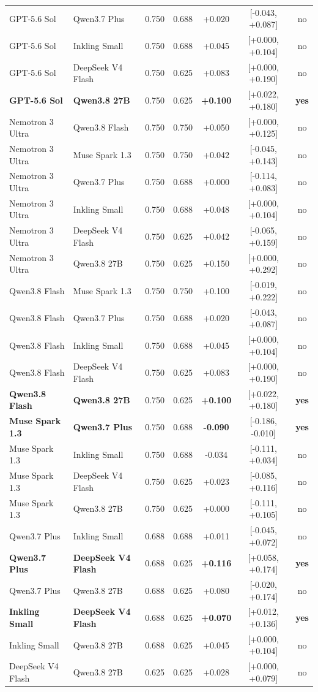 \begin{longtable}{llrrccc}
GPT-5.6 Sol & Qwen3.7 Plus & 0.750 & 0.688 & +0.020 & [-0.043, +0.087] & no \\
GPT-5.6 Sol & Inkling Small & 0.750 & 0.688 & +0.045 & [+0.000, +0.104] & no \\
GPT-5.6 Sol & DeepSeek V4 Flash & 0.750 & 0.625 & +0.083 & [+0.000, +0.190] & no \\
\textbf{GPT-5.6 Sol} & \textbf{Qwen3.8 27B} & 0.750 & 0.625 & \textbf{+0.100} & [+0.022, +0.180] & \textbf{yes} \\
Nemotron 3 Ultra & Qwen3.8 Flash & 0.750 & 0.750 & +0.050 & [+0.000, +0.125] & no \\
Nemotron 3 Ultra & Muse Spark 1.3 & 0.750 & 0.750 & +0.042 & [-0.045, +0.143] & no \\
Nemotron 3 Ultra & Qwen3.7 Plus & 0.750 & 0.688 & +0.000 & [-0.114, +0.083] & no \\
Nemotron 3 Ultra & Inkling Small & 0.750 & 0.688 & +0.048 & [+0.000, +0.104] & no \\
Nemotron 3 Ultra & DeepSeek V4 Flash & 0.750 & 0.625 & +0.042 & [-0.065, +0.159] & no \\
Nemotron 3 Ultra & Qwen3.8 27B & 0.750 & 0.625 & +0.150 & [+0.000, +0.292] & no \\
Qwen3.8 Flash & Muse Spark 1.3 & 0.750 & 0.750 & +0.100 & [-0.019, +0.222] & no \\
Qwen3.8 Flash & Qwen3.7 Plus & 0.750 & 0.688 & +0.020 & [-0.043, +0.087] & no \\
Qwen3.8 Flash & Inkling Small & 0.750 & 0.688 & +0.045 & [+0.000, +0.104] & no \\
Qwen3.8 Flash & DeepSeek V4 Flash & 0.750 & 0.625 & +0.083 & [+0.000, +0.190] & no \\
\textbf{Qwen3.8 Flash} & \textbf{Qwen3.8 27B} & 0.750 & 0.625 & \textbf{+0.100} & [+0.022, +0.180] & \textbf{yes} \\
\textbf{Muse Spark 1.3} & \textbf{Qwen3.7 Plus} & 0.750 & 0.688 & \textbf{-0.090} & [-0.186, -0.010] & \textbf{yes} \\
Muse Spark 1.3 & Inkling Small & 0.750 & 0.688 & -0.034 & [-0.111, +0.034] & no \\
Muse Spark 1.3 & DeepSeek V4 Flash & 0.750 & 0.625 & +0.023 & [-0.085, +0.116] & no \\
Muse Spark 1.3 & Qwen3.8 27B & 0.750 & 0.625 & +0.000 & [-0.111, +0.105] & no \\
Qwen3.7 Plus & Inkling Small & 0.688 & 0.688 & +0.011 & [-0.045, +0.072] & no \\
\textbf{Qwen3.7 Plus} & \textbf{DeepSeek V4 Flash} & 0.688 & 0.625 & \textbf{+0.116} & [+0.058, +0.174] & \textbf{yes} \\
Qwen3.7 Plus & Qwen3.8 27B & 0.688 & 0.625 & +0.080 & [-0.020, +0.174] & no \\
\textbf{Inkling Small} & \textbf{DeepSeek V4 Flash} & 0.688 & 0.625 & \textbf{+0.070} & [+0.012, +0.136] & \textbf{yes} \\
Inkling Small & Qwen3.8 27B & 0.688 & 0.625 & +0.045 & [+0.000, +0.104] & no \\
DeepSeek V4 Flash & Qwen3.8 27B & 0.625 & 0.625 & +0.028 & [+0.000, +0.079] & no \\
\end{longtable}
